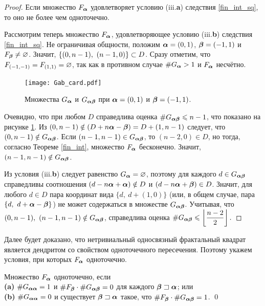 \begin{proof}
Если множество $F_{\bm{\alpha}}$ удовлетворяет условию (iii.{\bf a}) следствия \ref{fin_int_sq}, то оно не более чем одноточечно.

Рассмотрим теперь множество $F_{\bm{\alpha}}$, удовлетворяющее условию (iii.{\bf b}) следствия \ref{fin_int_sq}.
Не ограничивая общности, положим ${\bm{\alpha}}=(0,1)$, ${\bm{\beta}}=(-1,1)$ и $F_{\bm{\beta}}\neq\varnothing$.
Значит, $\{(0,n-1),\ (n-1,0)\}\subset D$.
Сразу отметим, что $F_{(-1,-1)}=F_{(1,1)}=\varnothing$, так как в противном случае $\#G_{\bm{\alpha}}>1$ и $F_{\bm{\alpha}}$ несчётно.

\begin{figure}[h!]
\centering
\texttt{[image: Gab\_card.pdf]}
 \caption{Множества $G_{{\bm{\alpha}}}$ и $G_{{\bm{\alpha}}{\bm{\beta}}}$ при ${\bm{\alpha}}=(0,1)$ и ${\bm{\beta}}=(-1,1)$.}
 \label{fig:Gab}
\end{figure} 

Очевидно, что при любом $D$ справедлива оценка $\#G_{{\bm{\alpha}}{\bm{\beta}}}\leqslant n-1$, что показано на рисунке \ref{fig:Gab}.
Из $(0,n-1)\notin (D+n{\bm{\alpha}}-{\bm{\beta}})=D+(1,n-1)$ следует, что $(0,n-1)\notin G_{{\bm{\alpha}}{\bm{\beta}}}$.
Если $(n-1,n-1)\in G_{{\bm{\alpha}}{\bm{\beta}}}$, то $(n-2,0)\in D$, но тогда, согласно Теореме \ref{fin_int}, множество $F_{\bm{\alpha}}$ бесконечно.
Значит, $(n-1,n-1)\notin G_{{\bm{\alpha}}{\bm{\beta}}}$.

Из условия (iii.{\bf b}) следует равенство $G_{{\bm{\alpha}}}=\varnothing$, поэтому для каждого $d\in G_{{\bm{\alpha}}{\bm{\beta}}}$ справедливы соотношения $(d-n{\bm{\alpha}}+{\bm{\alpha}})\notin D$ и $(d-n{\bm{\alpha}}+{\bm{\beta}})\in D$.
Значит, для любого $d\in D$ пара координат вида $\{d,\ d+(1,0)\}$ (или, в общем случае, пара $\{d,\ d+\bma-\bmb\}$) не может содержаться в множестве $G_{{\bm{\alpha}}{\bm{\beta}}}$.
Учитывая, что $(0,n-1),\ (n-1,n-1)\notin G_{{\bm{\alpha}}{\bm{\beta}}}$, справедлива оценка 
$\#G_{{\bm{\alpha}}{\bm{\beta}}}\leqslant\left\lfloor\dfrac{n-2}{2}\right\rfloor.$
\end{proof}

Далее будет доказано, что нетривиальный односвязный фрактальный квадрат является дендритом со  свойством одноточечного пересечения.
Поэтому укажем условия, при которых $F_{\bm{\alpha}}$ одноточечно.

\begin{corollary}\label{onepoint} 
Множество $F_{\bm{\alpha}}$ одноточечно, если \\
\textbf{(a)} $\#G_{{\bm{\alpha}}{\bm{\alpha}}}=1$ и $\#F_{\bm{\beta}}\cdot\#G_{{\bm{\alpha}}{\bm{\beta}}}=0$ для каждого ${\bm{\beta}}\sqsupset{\bm{\alpha}}$; или\\
\textbf{(b)} $\#G_{{\bm{\alpha}}{\bm{\alpha}}}=0$ и существует ${\bm{\beta}}\sqsupset{\bm{\alpha}}$ такое, что $\#F_{\bm{\beta}}\cdot\#G_{{\bm{\alpha}}{\bm{\beta}}}=1$.
\hfill\qed
\end{corollary}


